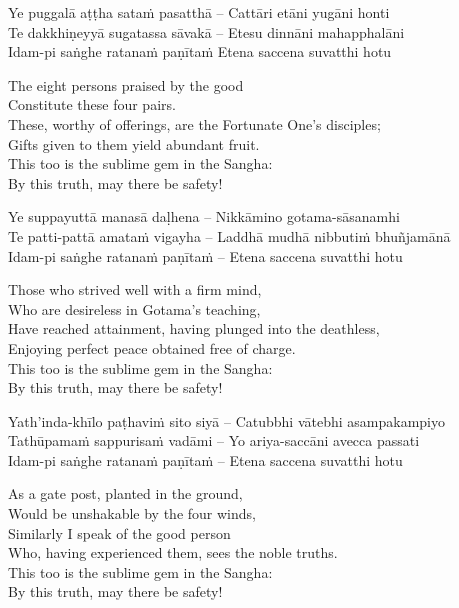 Ye puggalā aṭṭha sataṁ pasatthā – Cattāri etāni yugāni honti\\
Te dakkhiṇeyyā sugatassa sāvakā – Etesu dinnāni mahapphalāni\\
Idam-pi saṅghe ratanaṁ paṇītaṁ
Etena saccena suvatthi hotu

\begin{english}
  The eight persons praised by the good\\
  Constitute these four pairs.\\
  These, worthy of offerings, are the Fortunate One's disciples;\\
  Gifts given to them yield abundant fruit.\\
  This too is the sublime gem in the Sangha:\\
  By this truth, may there be safety!
\end{english}

Ye suppayuttā manasā daḷhena – Nikkāmino gotama-sāsanamhi\\
Te patti-pattā amataṁ vigayha – Laddhā mudhā nibbutiṁ bhuñjamānā\\
Idam-pi saṅghe ratanaṁ paṇītaṁ – Etena saccena suvatthi hotu

\begin{english}
  Those who strived well with a firm mind,\\
  Who are desireless in Gotama's teaching,\\
  Have reached attainment, having plunged into the deathless,\\
  Enjoying perfect peace obtained free of charge.\\
  This too is the sublime gem in the Sangha:\\
  By this truth, may there be safety!
\end{english}

Yath'inda-khīlo paṭhaviṁ sito siyā – Catubbhi vātebhi asampakampiyo\\
Tathūpamaṁ sappurisaṁ vadāmi – Yo ariya-saccāni avecca passati\\
Idam-pi saṅghe ratanaṁ paṇītaṁ – Etena saccena suvatthi hotu

\begin{english}
  As a gate post, planted in the ground,\\
  Would be unshakable by the four winds,\\
  Similarly I speak of the good person\\
  Who, having experienced them, sees the noble truths.\\
  This too is the sublime gem in the Sangha:\\
  By this truth, may there be safety!
\end{english}

